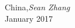 % 
% 
\preface



\vspace{1cm}
\begin{flushleft}\noindent
China,\hfill {\it Sean Zhang}\\
January 2017 \\
\end{flushleft}